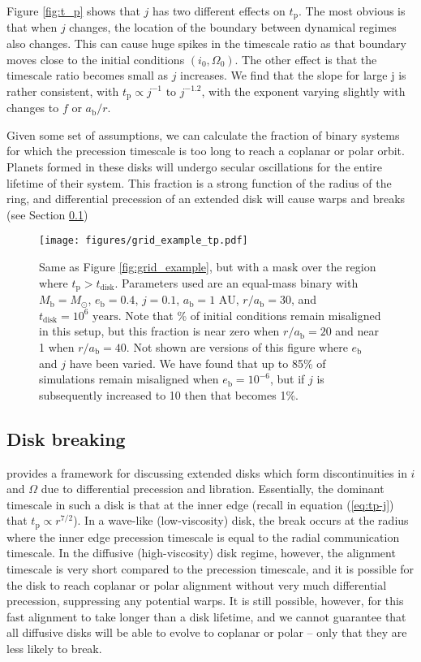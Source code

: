 \documentclass[twocolumn,linenumbers]{aastex631}
\begin{document}
Figure \ref{fig:t_p} shows that $j$ has two different effects on $t_\text{p}$. The most obvious is that when $j$ changes, the location of the boundary between dynamical regimes also changes. This can cause huge spikes in the timescale ratio as that boundary moves close to the initial conditions $(i_0, \Omega_0)$. The other effect is that the timescale ratio becomes small as $j$ increases. We find that the slope for large j is rather consistent, with $t_\text{p}\propto j^{-1} \text{ to } j^{-1.2}$, with the exponent varying slightly with changes to $f$ or $a_\text{b}/r$. 

Given some set of assumptions, we can calculate the fraction of binary systems for which the precession timescale is too long to reach a coplanar or polar orbit. Planets formed in these disks will undergo secular oscillations for the entire lifetime of their system. This fraction is a strong function of the radius of the ring, and differential precession of an extended disk will cause warps and breaks (see Section \ref{subsec:breaks})

\begin{figure}
    \texttt{[image: figures/grid\_example\_tp.pdf]}
    \caption{Same as Figure \ref{fig:grid_example}, but with a mask over the region where $t_\text{p} > t_\text{disk}$. Parameters used are an equal-mass binary with $M_\text{b} = M_\odot$, $e_\text{b} = 0.4$, $j=0.1$, $a_\text{b} = 1\text{ AU}$, $r/a_\text{b} = 30$, and $t_\text{disk} = 10^6 \text{ years}$. Note that \% of initial conditions remain misaligned in this setup, but this fraction is near zero when $r/a_\text{b} = 20$ and near 1 when $r/a_\text{b} = 40$. Not shown are versions of this figure where $e_\text{b}$ and $j$ have been varied. We have found that up to 85\% of simulations remain misaligned when $e_\text{b}=10^{-6}$, but if $j$ is subsequently increased to 10 then that becomes 1\%. }
    \label{fig:grid-tp}
\end{figure}

\subsection{Disk breaking}
\label{subsec:breaks}
\citet{rabago2024} provides a framework for discussing extended disks which form discontinuities in $i$ and $\Omega$ due to differential precession and libration. Essentially, the dominant timescale in such a disk is that at the inner edge (recall in equation (\ref{eq:tp-j}) that $t_\text{p} \propto r^{7/2}$).
In a wave-like (low-viscosity) disk, the break occurs at the radius where the inner edge precession timescale is equal to the radial communication timescale. In the diffusive (high-viscosity) disk regime, however, the alignment timescale is very short compared to the precession timescale, and it is possible for the disk to reach coplanar or polar alignment without very much differential precession, suppressing any potential warps. It is still possible, however, for this fast alignment to take longer than a disk lifetime, and we cannot guarantee that all diffusive disks will be able to evolve to coplanar or polar -- only that they are less likely to break.
\end{document}
